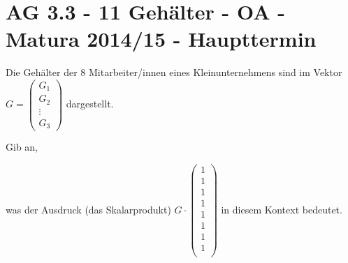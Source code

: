 \section{AG 3.3 - 11 Gehälter - OA - Matura 2014/15 - Haupttermin}

\begin{beispiel}[AG 3.3]{1} %
Die Gehälter der 8 Mitarbeiter/innen eines Kleinunternehmens sind im Vektor $G=\begin{pmatrix}
	G_1 \\
	G_2 \\
	\vdots \\
	G_3
\end{pmatrix}$ dargestellt. \leer

Gib an,

was der Ausdruck (das Skalarprodukt) \footnotesize $G\cdot \begin{pmatrix}
	1\\
	1\\
	1\\
	1\\
	1\\
	1\\
	1\\
	1\\
	\end{pmatrix}$ \normalsize in diesem Kontext \mbox{bedeutet}. 


\end{beispiel}